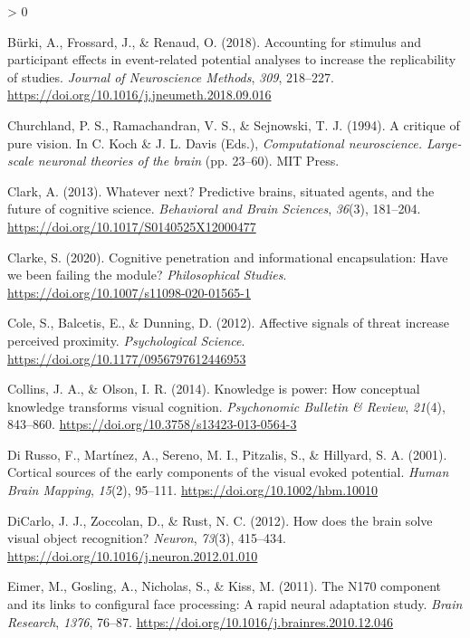 \documentclass[
  english,
  doc,12pt,twoside,floatsintext]{apa7}
\newlength{\cslhangindent}
\newenvironment{CSLReferences}[2] %
 {%
  \setlength{\parindent}{0pt}
  \ifodd #1 \everypar{\setlength{\hangindent}{\cslhangindent}}\ignorespaces\fi
  \ifnum #2 > 0
  \setlength{\parskip}{#2\baselineskip}
  \fi
 }%
 {}
\begin{document}
\begin{CSLReferences}{1}{0}
\leavevmode\hypertarget{ref-buxfcrki2018}{}%
Bürki, A., Frossard, J., \& Renaud, O. (2018). Accounting for stimulus and participant effects in event-related potential analyses to increase the replicability of studies. \emph{Journal of Neuroscience Methods}, \emph{309}, 218--227. \url{https://doi.org/10.1016/j.jneumeth.2018.09.016}

\leavevmode\hypertarget{ref-churchland1994}{}%
Churchland, P. S., Ramachandran, V. S., \& Sejnowski, T. J. (1994). A critique of pure vision. In C. Koch \& J. L. Davis (Eds.), \emph{Computational neuroscience. Large-scale neuronal theories of the brain} (pp. 23--60). MIT Press.

\leavevmode\hypertarget{ref-clark2013}{}%
Clark, A. (2013). Whatever next? {Predictive} brains, situated agents, and the future of cognitive science. \emph{Behavioral and Brain Sciences}, \emph{36}(3), 181--204. \url{https://doi.org/10.1017/S0140525X12000477}

\leavevmode\hypertarget{ref-clarke2020}{}%
Clarke, S. (2020). Cognitive penetration and informational encapsulation: Have we been failing the module? \emph{Philosophical Studies}. \url{https://doi.org/10.1007/s11098-020-01565-1}

\leavevmode\hypertarget{ref-cole2012}{}%
Cole, S., Balcetis, E., \& Dunning, D. (2012). Affective signals of threat increase perceived proximity. \emph{Psychological Science}. \url{https://doi.org/10.1177/0956797612446953}

\leavevmode\hypertarget{ref-collins2014}{}%
Collins, J. A., \& Olson, I. R. (2014). Knowledge is power: How conceptual knowledge transforms visual cognition. \emph{Psychonomic Bulletin \& Review}, \emph{21}(4), 843--860. \url{https://doi.org/10.3758/s13423-013-0564-3}

\leavevmode\hypertarget{ref-dirusso2001}{}%
Di Russo, F., Martínez, A., Sereno, M. I., Pitzalis, S., \& Hillyard, S. A. (2001). Cortical sources of the early components of the visual evoked potential. \emph{Human Brain Mapping}, \emph{15}(2), 95--111. \url{https://doi.org/10.1002/hbm.10010}

\leavevmode\hypertarget{ref-dicarlo2012}{}%
DiCarlo, J. J., Zoccolan, D., \& Rust, N. C. (2012). How does the brain solve visual object recognition? \emph{Neuron}, \emph{73}(3), 415--434. \url{https://doi.org/10.1016/j.neuron.2012.01.010}

\leavevmode\hypertarget{ref-eimer2011}{}%
Eimer, M., Gosling, A., Nicholas, S., \& Kiss, M. (2011). The {N170} component and its links to configural face processing: A rapid neural adaptation study. \emph{Brain Research}, \emph{1376}, 76--87. \url{https://doi.org/10.1016/j.brainres.2010.12.046}


\end{CSLReferences}
\end{document}
